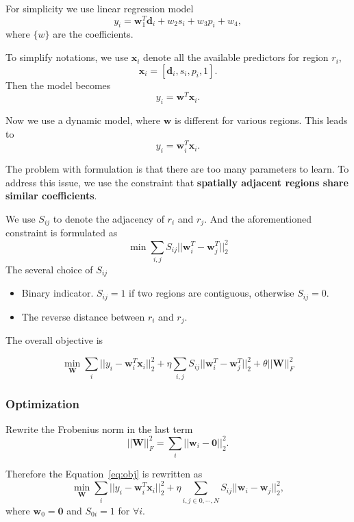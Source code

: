 For simplicity we use linear regression model
\[
y_i = \mathbf{w}_1^T \mathbf{d}_i + w_2 s_i + w_3 p_i + w_4,
\]
where $\{ w \}$ are the coefficients.

To simplify notations, we use $\mathbf{x}_i$ denote all the available predictors for region $r_i$,
\[
\mathbf{x}_i = [ \mathbf{d}_i, s_i, p_i, 1 ].
\]
Then the model becomes 
\[
y_i = \mathbf{w}^T \mathbf{x}_i.
\]



Now we use a dynamic model, where $\mathbf{w}$ is different for various regions.
This leads to 
\[
y_i  = \mathbf{w}_i^T \mathbf{x}_i.
\]


The problem with formulation is that there are too many parameters to learn. To address this issue, we use the constraint that \textbf{spatially adjacent regions share similar coefficients}.

We use $S_{ij}$ to denote the adjacency of $r_i$ and $r_j$. And the aforementioned constraint is formulated as
\[
\min \sum_{i,j} S_{ij} ||\mathbf{w}_i^T - \mathbf{w}_j^T||_2^2
\] The several choice of $S_{ij}$
\begin{itemize}
\item Binary indicator. $S_{ij} = 1$ if two regions are contiguous, otherwise $S_{ij} = 0$.
\item The reverse distance between $r_i$ and $r_j$. 
\end{itemize}

The overall objective is

\begin{equation}
\label{eq:obj}
\min_{\mathbf{W}}  \sum_i || y_i - \mathbf{w}_i^T \mathbf{x}_i ||_2^2 + \eta \sum_{i,j} S_{ij} ||\mathbf{w}_i^T - \mathbf{w}_j^T||_2^2 
+ \theta || \mathbf{W} ||_F^2
\end{equation}




\subsubsection{Optimization}


Rewrite the Frobenius norm in the last term
\[
|| \mathbf{W} ||_F^2 = \sum_i || \mathbf{w}_i - \mathbf{0}||_2^2.
\]


Therefore the Equation~\ref{eq:obj} is rewritten as
\begin{equation}
\label{eq:obj2}
\min_{\mathbf{W}}  \sum_i || y_i - \mathbf{w}_i^T \mathbf{x}_i ||_2^2 + \eta \sum_{i,j \in 0, \cdots, N} S_{ij} || \mathbf{w}_i - \mathbf{w}_j ||_2^2,
\end{equation}
where $\mathbf{w}_0 = \mathbf{0}$ and $S_{0i} = 1$ for $\forall i$.


